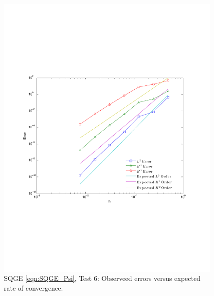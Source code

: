 \begin{figure}
  \begin{center}
    \includegraphics[scale=0.5]{Figures/SQGEeConvergence.pdf}
    \caption{SQGE \eqref{eqn:SQGE_Psi}, Test 6: Observeed errors versus expected
      rate of convergence.}
    \label{fig:SQGEeErrors}
  \end{center}
\end{figure}

